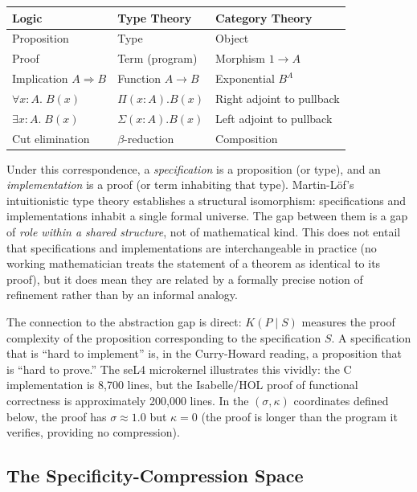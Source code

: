 \begin{center}
\small
\begin{tabular}{lll}
\toprule
\textbf{Logic} & \textbf{Type Theory} & \textbf{Category Theory} \\
\midrule
Proposition & Type & Object \\
Proof & Term (program) & Morphism $1 \to A$ \\
Implication $A \Rightarrow B$ & Function $A \to B$ & Exponential $B^A$ \\
$\forall x{:}A.\; B(x)$ & $\Pi(x{:}A).B(x)$ & Right adjoint to pullback \\
$\exists x{:}A.\; B(x)$ & $\Sigma(x{:}A).B(x)$ & Left adjoint to pullback \\
Cut elimination & $\beta$-reduction & Composition \\
\bottomrule
\end{tabular}
\end{center}

Under this correspondence, a \emph{specification} is a proposition (or type), and an \emph{implementation} is a proof (or term inhabiting that type). Martin-L\"{o}f's intuitionistic type theory \citep{martinlof1979constructive} establishes a structural isomorphism: specifications and implementations inhabit a single formal universe. The gap between them is a gap of \emph{role within a shared structure}, not of mathematical kind. This does not entail that specifications and implementations are interchangeable in practice (no working mathematician treats the statement of a theorem as identical to its proof), but it does mean they are related by a formally precise notion of refinement rather than by an informal analogy.

The connection to the abstraction gap is direct: $K(P \mid S)$ measures the proof complexity of the proposition corresponding to the specification $S$. A specification that is ``hard to implement'' is, in the Curry-Howard reading, a proposition that is ``hard to prove.'' The seL4 microkernel illustrates this vividly: the C implementation is 8,700 lines, but the Isabelle/HOL proof of functional correctness is approximately 200,000 lines. In the $(\sigma, \kappa)$ coordinates defined below, the proof has $\sigma \approx 1.0$ but $\kappa = 0$ (the proof is longer than the program it verifies, providing no compression).

\subsection{The Specificity-Compression Space}

